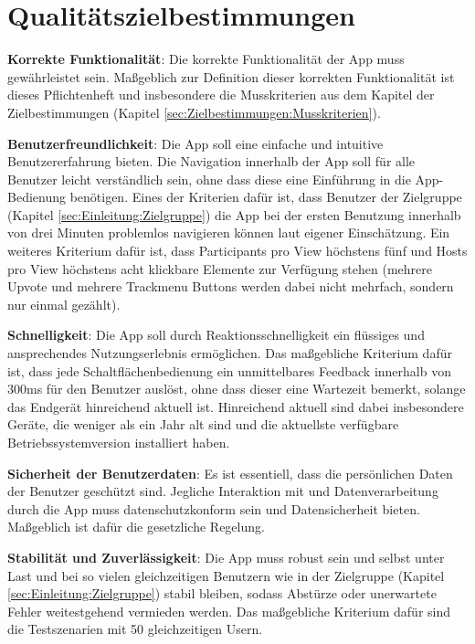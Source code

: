 \documentclass[oneside, ngerman]{sdqtechreport}
\begin{document}
\chapter{Qualitätszielbestimmungen}
\label{chap:Qualitätszielbestimmungen}

\textbf{Korrekte Funktionalität}: Die korrekte Funktionalität der App muss gewährleistet sein. Maßgeblich zur Definition dieser korrekten Funktionalität ist dieses Pflichtenheft und insbesondere die Musskriterien aus dem Kapitel der Zielbestimmungen (Kapitel \ref{sec:Zielbestimmungen:Musskriterien}).

\textbf{Benutzerfreundlichkeit}: Die App soll eine einfache und intuitive Benutzererfahrung bieten. Die Navigation innerhalb der App soll für alle Benutzer leicht verständlich sein, ohne dass diese eine Einführung in die App-Bedienung benötigen. Eines der Kriterien dafür ist, dass Benutzer der Zielgruppe (Kapitel \ref{sec:Einleitung:Zielgruppe}) die App bei der ersten Benutzung innerhalb von drei Minuten problemlos navigieren können laut eigener Einschätzung. Ein weiteres Kriterium dafür ist, dass Participants pro View höchstens fünf und Hosts pro View höchstens acht klickbare Elemente zur Verfügung stehen (mehrere Upvote und mehrere Trackmenu Buttons werden dabei nicht mehrfach, sondern nur einmal gezählt).
\label{Qualitätszielbestimmungen_Benutzerfreundlichkeit}

\textbf{Schnelligkeit}: Die App soll durch Reaktionsschnelligkeit ein flüssiges und ansprechendes Nutzungserlebnis ermöglichen. Das maßgebliche Kriterium dafür ist, dass jede Schaltflächenbedienung ein unmittelbares Feedback innerhalb von 300ms für den Benutzer auslöst, ohne dass dieser eine Wartezeit bemerkt, solange das Endgerät hinreichend aktuell ist. Hinreichend aktuell sind dabei insbesondere Geräte, die weniger als ein Jahr alt sind und die aktuellste verfügbare Betriebssystemversion installiert haben.

\textbf{Sicherheit der Benutzerdaten}: Es ist essentiell, dass die persönlichen Daten der Benutzer geschützt sind. Jegliche Interaktion mit und Datenverarbeitung durch die App muss datenschutzkonform sein und Datensicherheit bieten. Maßgeblich ist dafür die gesetzliche Regelung.

\textbf{Stabilität und Zuverlässigkeit}: Die App muss robust sein und selbst unter Last und bei so vielen gleichzeitigen Benutzern wie in der Zielgruppe (Kapitel \ref{sec:Einleitung:Zielgruppe}) stabil bleiben, sodass Abstürze oder unerwartete Fehler weitestgehend vermieden werden. Das maßgebliche Kriterium dafür sind die Testszenarien mit 50 gleichzeitigen Usern.
\end{document}
